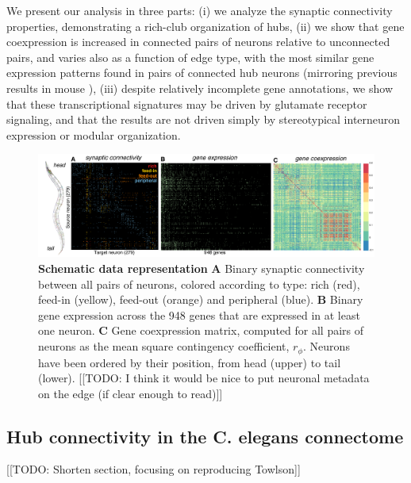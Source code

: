 \documentclass[10pt,letterpaper]{article}
\begin{document}
We present our analysis in three parts:
(i) we analyze the synaptic connectivity properties, demonstrating a rich-club organization of hubs,
(ii) we show that gene coexpression is increased in connected pairs of neurons relative to unconnected pairs, and varies also as a function of edge type, with the most similar gene expression patterns found in pairs of connected hub neurons (mirroring previous results in mouse \cite{Fulcher:2016ck}),
(iii) despite relatively incomplete gene annotations, we show that these transcriptional signatures may be driven by glutamate receptor signaling, and that the results are not driven simply by stereotypical interneuron expression or modular organization.

\begin{figure}[t]
  \centering
    \includegraphics[width=1\textwidth]{schematic.pdf}
 \caption{\textbf{Schematic data representation}
 \textbf{A} Binary synaptic connectivity between all pairs of neurons, colored according to type: rich (red), feed-in (yellow), feed-out (orange) and peripheral (blue).
  \textbf{B} Binary gene expression across the 948 genes that are expressed in at least one neuron.
 \textbf{C} Gene coexpression matrix, computed for all pairs of neurons as the mean square contingency coefficient, $r_\phi$.
Neurons have been ordered by their position, from head (upper) to tail (lower).
[[TODO: I think it would be nice to put neuronal metadata on the edge (if clear enough to read)]]
}
\label{fig:SchematicRepresentation}
\end{figure}


\subsection*{Hub connectivity in the C. elegans connectome}
[[TODO: Shorten section, focusing on reproducing Towlson]]
\end{document}
